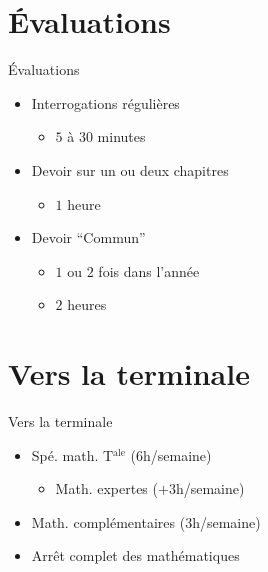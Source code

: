 \documentclass[17pt,xcolor=x11names]{beamer}
\begin{document}
\section*{Évaluations}
\begin{frame}{Évaluations}
  \begin{itemize}
    \item Interrogations régulières
      \begin{itemize}
        \item $5$ à $30$ minutes
      \end{itemize}
    \item Devoir sur un ou deux chapitres
      \begin{itemize}
        \item $1$ heure
      \end{itemize}
    \item Devoir ``Commun''
      \begin{itemize}
        \item $1$ ou $2$ fois dans l'année
        \item $2$ heures
      \end{itemize}
  \end{itemize}
\end{frame}

\section*{Vers la terminale}
\begin{frame}{Vers la terminale}
      \begin{itemize}
        \item Spé. math. T$^\text{ale}$ ($6$h/semaine)
          \begin{itemize}
              \item Math. expertes ($+3$h/semaine)
          \end{itemize}
        \item Math. complémentaires ($3$h/semaine)
        \item Arrêt complet des mathématiques
  \end{itemize}
\end{frame}
\end{document}
